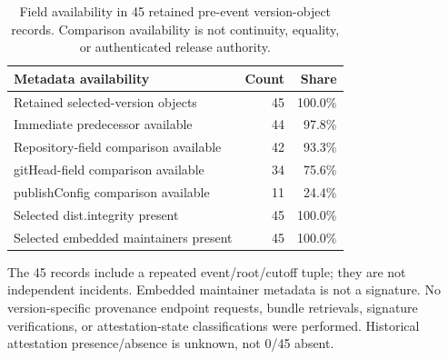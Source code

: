 \begin{table}[t]
\centering
\footnotesize
\caption{Field availability in 45 retained pre-event version-object records. Comparison availability is not continuity, equality, or authenticated release authority.}
\label{tab:q1_release_authority}
\begin{tabular}{lrr}
\toprule
Metadata availability & Count & Share\\
\midrule
Retained selected-version objects & 45 & 100.0\%\\
Immediate predecessor available & 44 & 97.8\%\\
Repository-field comparison available & 42 & 93.3\%\\
gitHead-field comparison available & 34 & 75.6\%\\
publishConfig comparison available & 11 & 24.4\%\\
Selected dist.integrity present & 45 & 100.0\%\\
Selected embedded maintainers present & 45 & 100.0\%\\
\bottomrule
\end{tabular}
\par\smallskip\begin{minipage}{0.98\textwidth}\footnotesize The 45 records include a repeated event/root/cutoff tuple; they are not independent incidents. Embedded maintainer metadata is not a signature. No version-specific provenance endpoint requests, bundle retrievals, signature verifications, or attestation-state classifications were performed. Historical attestation presence/absence is unknown, not 0/45 absent.\end{minipage}
\end{table}
